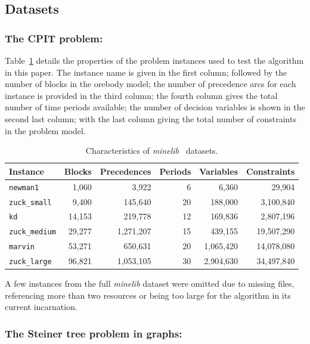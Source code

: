 \documentclass[journal]{IEEEtran}
\begin{document}
\subsection{Datasets}
\subsubsection*{The CPIT problem:}
Table~\ref{tab:datasets} details the properties of the problem instances used to test the algorithm in this paper. The instance name is given in the first column; followed by the number of blocks in the orebody model; the number of precedence arcs for each instance is provided in the third column; the fourth column gives the total number of time periods available; the number of decision variables is shown in the second last column; with the last column giving the total number of constraints in the problem model.\par
%
\begin{table}[h!]
\centering
\caption{Characteristics of \emph{minelib}~\cite{espinoza_minelib:_2012} datasets.}\label{tab:datasets}
\begin{adjustbox}{width=0.48\textwidth}
\begin{tabular}{lrrrrr} \toprule
Instance & Blocks & Precedences & Periods & Variables & Constraints\\
\hline
\texttt{newman1} & 1,060 & 3,922 & 6 & 6,360 & 29,904\\
\texttt{zuck\_small} & 9,400 & 145,640 & 20 & 188,000 & 3,100,840\\
\texttt{kd} & 14,153 & 219,778 & 12 & 169,836 & 2,807,196\\
\texttt{zuck\_medium} & 29,277 & 1,271,207 & 15 & 439,155 & 19,507,290\\
\texttt{marvin} & 53,271 & 650,631 & 20 & 1,065,420 & 14,078,080\\
\texttt{zuck\_large} & 96,821 & 1,053,105 & 30 & 2,904,630 & 34,497,840\\
\bottomrule
\end{tabular}
\end{adjustbox}
\end{table}
%
A few instances from the full \emph{minelib} dataset were omitted due to missing files, referencing more than two resources or being too large for the algorithm in its current incarnation.

\subsubsection*{The Steiner tree problem in graphs:}
\end{document}
